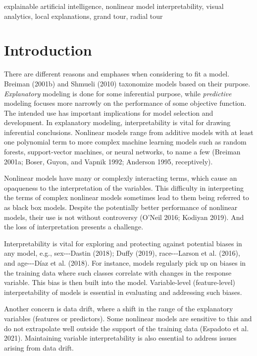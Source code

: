 \documentclass[11pt,twoside]{article}
\begin{document}
\begin{keywords}
explainable artificial intelligence, nonlinear model interpretability, visual analytics, local explanations, grand tour, radial tour
\end{keywords}


\hypertarget{sec:intro}{%
\section{Introduction}\label{sec:intro}}

There are different reasons and emphases when considering to fit a model. Breiman (2001b) and Shmueli (2010) taxonomize models based on their purpose. \emph{Explanatory} modeling is done for some inferential purpose, while \emph{predictive} modeling focuses more narrowly on the performance of some objective function. The intended use has important implications for model selection and development. In explanatory modeling, interpretability is vital for drawing inferential conclusions. Nonlinear models range from additive models with at least one polynomial term to more complex machine learning models such as random forests, support-vector machines, or neural networks, to name a few (Breiman 2001a; Boser, Guyon, and Vapnik 1992; Anderson 1995, receptively).

Nonlinear models have many or complexly interacting terms, which cause an opaqueness to the interpretation of the variables. This difficulty in interpreting the terms of complex nonlinear models sometimes lead to them being referred to as black box models. Despite the potentially better performance of nonlinear models, their use is not without controversy (O'Neil 2016; Kodiyan 2019). And the loss of interpretation presents a challenge.

Interpretability is vital for exploring and protecting against potential biases in any model, e.g., sex-\/-\/-Dastin (2018); Duffy (2019), race-\/-\/-Larson et al. (2016), and age-\/-\/-Díaz et al. (2018). For instance, models regularly pick up on biases in the training data where such classes correlate with changes in the response variable. This bias is then built into the model. Variable-level (feature-level) interpretability of models is essential in evaluating and addressing such biases.

Another concern is data drift, where a shift in the range of the explanatory variables (features or predictors). Some nonlinear models are sensitive to this and do not extrapolate well outside the support of the training data (Espadoto et al. 2021). Maintaining variable interpretability is also essential to address issues arising from data drift.
\end{document}
